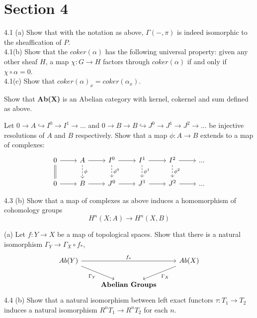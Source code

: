 \newpage
\section*{Section 4}
4.1 (a) Show that with the notation as above, $\Gamma(-, \pi)$ is indeed isomorphic to the sheaffication of $P$. \\
4.1(b) Show that the $coker(\alpha)$ has the following universal property: given any other sheaf $H$, a map $\chi: G \rightarrow H$ factors through $coker(\alpha)$ if and only if $\chi \circ \alpha = 0$.\\
4.1(c) Show that $coker(\alpha)_x = coker(\alpha_x)$.

 Show that \textbf{Ab(X)} is an Abelian category with kernel, cokernel and sum defined as above.

 Let $0 \rightarrow A \hookrightarrow I^0 \rightarrow I^1 \rightarrow ...$ and $0 \rightarrow B \rightarrow B \hookrightarrow J^0 \rightarrow J^1 \rightarrow J^2 \rightarrow ...$ be injective resolutions of $A$ and $B$ respectively. Show that a map $\phi: A \rightarrow B$ extends to a map of complexes:
\[
\begin{tikzcd}
0 \arrow[r] \arrow[d, equal]
& A \arrow[r] \arrow[d, "\phi", dashed]
& I^0 \arrow[r] \arrow[d, "\phi^0", dashed]
& I^1 \arrow[r] \arrow[d, "\phi^1", dashed]
& I^2 \arrow[r] \arrow[d, "\phi^2", dashed]
& ...
\\
0 \arrow[r]
& B \arrow[r]
& J^0 \arrow[r]
& J^1 \arrow[r]
& J^2 \arrow[r]
& ...
\end{tikzcd}
\]


4.3 (b) Show that a map of complexes as above induces a homomorphism of cohomology groups 
\[ H^n(X;A) \rightarrow H^n(X,B)\] 

(a) Let $f: Y \rightarrow X$ be a map of topological spaces. Show that there is a natural isomorphism $\Gamma_Y \rightarrow \Gamma_X \circ f_*$, 
\[
\begin{tikzcd}
Ab(Y) \arrow[rr,"f_*"] \arrow[rd, "\Gamma_Y"'] & & Ab(X) \arrow[ld, "\Gamma_X"]\\
& \textbf{Abelian Groups} 
\end{tikzcd}
\]
4.4 (b) Show that a natural isomorphism between left exact functors $\tau: T_1 \rightarrow  T_2$ induces a natural isomorphism $R^nT_1 \rightarrow R^nT_2$ for each $n$.

